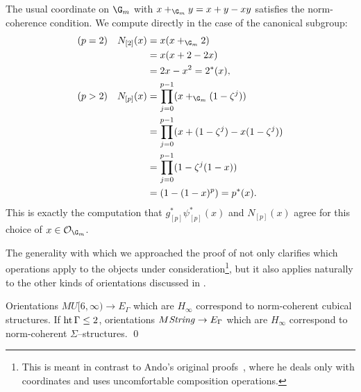 \begin{example}
The usual coordinate on $\G_m$ with $x +_{\G_m} y = x + y - xy$ satisfies the norm-coherence condition.  We compute directly in the case of the canonical subgroup:
\begin{align*}
(p = 2) & & N_{[2]}(x) & = x(x +_{\G_m} 2) \\
& & & = x (x + 2 - 2x) \\
& & & = 2x - x^2 = 2^*(x), \\
(p > 2) & & N_{[p]}(x) & = \prod_{j=0}^{p-1} (x +_{\G_m} (1 - \zeta^j)) \\
& & & = \prod_{j=0}^{p-1} (x + (1 - \zeta^j) - x(1 - \zeta^j)) \\
& & & = \prod_{j=0}^{p-1} (1 - \zeta^j(1 - x)) \\
& & & = (1 - (1 - x)^p) = p^*(x).
\end{align*}
This is exactly the computation that $g_{[p]}^* \psi_{[p]}^*(x)$ and $N_{[p]}(x)$ agree for this choice of $x \in \sheaf O_{\G_m}$.
\end{example}

The generality with which we approached the proof of  not only clarifies which operations apply to the objects under consideration\footnote{This is meant in contrast to Ando's original proofs~\cite[Section 2.6]{Ando}, where he deals only with coordinates and uses uncomfortable composition operations.}, but it also applies naturally to the other kinds of orientations discussed in .

\begin{theorem}
Orientations $MU[6, \infty) \to E_\Gamma$ which are $H_\infty$ correspond to norm-coherent cubical structures.  If $\operatorname{ht}{\Gamma} \le 2$, orientations $M\mathit{String} \to E_\Gamma$ which are $H_\infty$ correspond to norm-coherent $\Sigma$--structures. \qed
\end{theorem}


